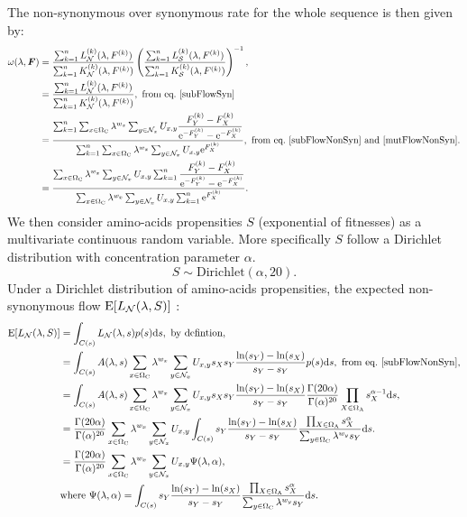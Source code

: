 The non-synonymous over synonymous rate for the whole sequence is then given by:
\begin{align}
\omega(\lambda, \bm{F})
& =\dfrac{\sum_{k=1}^{n} L_{\NonSyn}^{(k)}(\lambda, F^{(k)})}{\sum_{k=1}^{n}K_{\NonSyn}^{(k)}(\lambda, F^{(k)})}  \left( \dfrac{\sum_{k=1}^{n}L_{\Syn}^{(k)}(\lambda, F^{(k)})}{\sum_{k=1}^{n}K_{\Syn}^{(k)}(\lambda, F^{(k)})}  \right)^{-1}, \\
& =\dfrac{\sum_{k=1}^{n} L_{\NonSyn}^{(k)}(\lambda, F^{(k)})}{\sum_{k=1}^{n}K_{\NonSyn}^{(k)}(\lambda, F^{(k)})}, \ \textrm{from eq.}\ \ref{subFlowSyn} \\
& =\dfrac{ \sum_{k=1}^{n} \sum_{x \in \SetCodon} \lambda^{w_x} \sum_{y \in \NxNonSyn}  U_{x, y} \dfrac{F_Y^{(k)} - F_X^{(k)}}{\e^{ - F_Y^{(k)}} -  \e^{- F_X^{(k)}} } }{ \sum_{k=1}^{n} \sum_{x \in \SetCodon}  \lambda^{w_x}  \sum_{y \in \NxNonSyn} U_{x, y} \e^{F_X^{(k)}}}, \ \textrm{from eq.}\ \ref{subFlowNonSyn} \ \text{and} \ \ref{mutFlowNonSyn}.
\\
& =\dfrac{ \sum_{x \in \SetCodon} \lambda^{w_x} \sum_{y \in \NxNonSyn}  U_{x, y}  \sum_{k=1}^{n} \dfrac{F_Y^{(k)} - F_X^{(k)}}{\e^{ - F_Y^{(k)}} -  \e^{- F_X^{(k)}} } }{  \sum_{x \in \SetCodon}  \lambda^{w_x}  \sum_{y \in \NxNonSyn} U_{x, y}  \sum_{k=1}^{n} \e^{F_X^{(k)}}}.
\label{omegaSeq}
\end{align}
We then consider amino-acids propensities $S$ (exponential of fitnesses) as a multivariate continuous random variable.
More specifically $S$ follow a Dirichlet distribution with concentration parameter $\alpha$.
\begin{equation}
S \sim \mathrm{Dirichlet}(\alpha, 20).
\end{equation}
Under a Dirichlet distribution of amino-acids propensities, the expected \gls{non-synonymous} flow $\operatorname{E} [L_{\mathcal{N}}(\lambda, S)]$ :
\begin{align}
\operatorname{E} [L_{\mathcal{N}}(\lambda, S)]
& =\int_{C(s)} L_{\mathcal{N}}(\lambda, s) p(s) \mathrm{d} s, \ \textrm{by defintion}, \\
& =\int_{C(s)} A(\lambda, s) \sum_{x \in \Omega_{\mathrm{C}}} \lambda^{w_x} \sum_{y \in \mathcal{N}_x} U_{x, y} s_X s_Y\dfrac{\ln(s_Y)-\ln(s_X)}{s_Y - s_Y} p(s) \mathrm{d} s , \ \textrm{from eq.}\ \ref{subFlowNonSyn}, \\
& =\int_{C(s)} A(\lambda, s) \sum_{x \in \Omega_{\mathrm{C}}} \lambda^{w_x} \sum_{y \in \mathcal{N}_x} U_{x, y} s_X s_Y\dfrac{\ln(s_Y)-\ln(s_X)}{s_Y - s_Y} {\frac {\Gamma (20 \alpha)}{\Gamma (\alpha )^{20}}} \prod_{X \in \Omega_{\mathrm{A}}} s_X^{\alpha-1} \mathrm{d} s,\\
& ={\frac {\Gamma (20 \alpha)}{\Gamma (\alpha )^{20}}} \sum_{x \in \Omega_{\mathrm{C}}} \lambda^{w_x} \sum_{y \in \mathcal{N}_x} U_{x, y} \int_{C(s)} s_Y\dfrac{\ln(s_Y)-\ln(s_X)}{s_Y - s_Y} \dfrac{\prod_{X \in \Omega_{\mathrm{A}}} s_X^{\alpha}}{\sum_{y \in \Omega_{\mathrm{C}}} \lambda^{w_y} s_Y} \mathrm{d} s.\\
& ={\frac {\Gamma (20 \alpha)}{\Gamma (\alpha )^{20}}} \sum_{x \in \Omega_{\mathrm{C}}} \lambda^{w_x} \sum_{y \in \mathcal{N}_x} U_{x, y} \Psi(\lambda, \alpha), \\
& \textrm{where} \ \Psi(\lambda, \alpha) = \int_{C(s)} s_Y\dfrac{\ln(s_Y)-\ln(s_X)}{s_Y - s_Y} \dfrac{\prod_{X \in \Omega_{\mathrm{A}}} s_X^{\alpha}}{\sum_{y \in \Omega_{\mathrm{C}}} \lambda^{w_y} s_Y} \mathrm{d} s.
\end{align}

